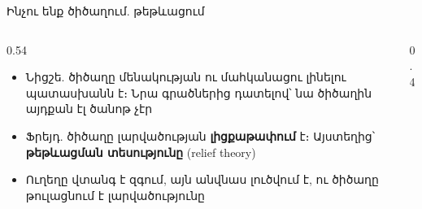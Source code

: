 \begin{frame}{Ինչու ենք ծիծաղում. թեթևացում}
  \begin{columns}[c]
    \begin{column}{0.54\textwidth}
      \begin{itemize}
        \item Նիցշե. ծիծաղը մենակության ու մահկանացու լինելու պատասխանն է։ Նրա գրածներից դատելով՝ նա ծիծաղին այդքան էլ ծանոթ չէր
        \item<2-> Ֆրեյդ. ծիծաղը լարվածության \textbf{լիցքաթափում} է։ Այստեղից՝ \textbf{թեթևացման տեսությունը} (relief theory)
        \item<3-> Ուղեղը վտանգ է զգում, այն անվնաս լուծվում է, ու ծիծաղը թուլացնում է լարվածությունը
      \end{itemize}
    \end{column}
    \begin{column}{0.4\textwidth}
    \end{column}
  \end{columns}
\end{frame}


